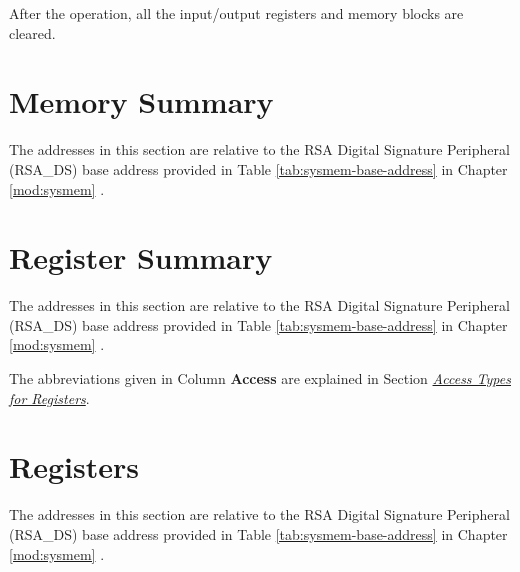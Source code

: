 \documentclass[main\_\_EN.tex]{subfiles}
\begin{document}
After the operation, all the input/output registers and memory blocks are cleared.

\clearpage
\section{ Memory Summary}
\label{sec:digsig-mem-summ}

The addresses in this section are relative to the RSA Digital Signature Peripheral (RSA\_DS) base address provided in Table \ref{tab:sysmem-base-address} in Chapter \ref{mod:sysmem} \textit{}.





\clearpage
\section{Register Summary}
\label{sec:digsig-reg-summ}
\hypertarget{digsig-reg-summ}{}

The addresses in this section are relative to the RSA Digital Signature Peripheral (RSA\_DS) base address provided in Table \ref{tab:sysmem-base-address} in Chapter \ref{mod:sysmem} \textit{}.

The abbreviations given in Column \textbf{Access} are explained in Section \hyperref[glossary-access-types]{\textit{Access Types for Registers}}.






\clearpage
\section{Registers}

The addresses in this section are relative to the RSA Digital Signature Peripheral (RSA\_DS) base address provided in Table \ref{tab:sysmem-base-address} in Chapter \ref{mod:sysmem} \textit{}.


\end{document}
